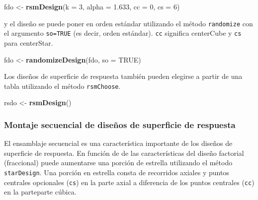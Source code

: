 \documentclass[
]{book}
\newenvironment{Shaded}{\begin{snugshade}}{\end{snugshade}}
\newcommand{\AttributeTok}[1]{\textcolor[rgb]{0.13,0.29,0.53}{#1}}
\newcommand{\ConstantTok}[1]{\textcolor[rgb]{0.56,0.35,0.01}{#1}}
\newcommand{\DecValTok}[1]{\textcolor[rgb]{0.00,0.00,0.81}{#1}}
\newcommand{\FloatTok}[1]{\textcolor[rgb]{0.00,0.00,0.81}{#1}}
\newcommand{\FunctionTok}[1]{\textcolor[rgb]{0.13,0.29,0.53}{\textbf{#1}}}
\newcommand{\NormalTok}[1]{#1}
\newcommand{\OtherTok}[1]{\textcolor[rgb]{0.56,0.35,0.01}{#1}}
\begin{document}
\begin{Shaded}
\begin{Highlighting}[]
\NormalTok{fdo }\OtherTok{\textless{}{-}} \FunctionTok{rsmDesign}\NormalTok{(}\AttributeTok{k =} \DecValTok{3}\NormalTok{, }\AttributeTok{alpha =} \FloatTok{1.633}\NormalTok{, }\AttributeTok{cc =} \DecValTok{0}\NormalTok{, }\AttributeTok{cs =} \DecValTok{6}\NormalTok{)}
\end{Highlighting}
\end{Shaded}

y el diseño se puede poner en orden estándar utilizando el método \texttt{randomize} con el argumento \texttt{so=TRUE} (es decir, orden estándar). \texttt{cc} significa centerCube y \texttt{cs} para centerStar.

\begin{Shaded}
\begin{Highlighting}[]
\NormalTok{fdo }\OtherTok{\textless{}{-}} \FunctionTok{randomizeDesign}\NormalTok{(fdo, }\AttributeTok{so =} \ConstantTok{TRUE}\NormalTok{)}
\end{Highlighting}
\end{Shaded}

Los diseños de superficie de respuesta también pueden elegirse a partir de una tabla utilizando el método \texttt{rsmChoose}.

\begin{Shaded}
\begin{Highlighting}[]
\NormalTok{rsdo }\OtherTok{\textless{}{-}} \FunctionTok{rsmDesign}\NormalTok{()}
\end{Highlighting}
\end{Shaded}

\hypertarget{montaje-secuencial-de-diseuxf1os-de-superficie-de-respuesta}{%
\subsubsection{Montaje secuencial de diseños de superficie de respuesta}\label{montaje-secuencial-de-diseuxf1os-de-superficie-de-respuesta}}

El ensamblaje secuencial es una característica importante de los diseños de superficie de respuesta. En función de de las características del diseño factorial (fraccional) puede aumentarse una porción de estrella utilizando el método \texttt{starDesign}. Una porción en estrella consta de recorridos axiales
y puntos centrales opcionales (\texttt{cs}) en la parte axial a diferencia de los puntos centrales (\texttt{cc}) en la parteparte cúbica.
\end{document}
